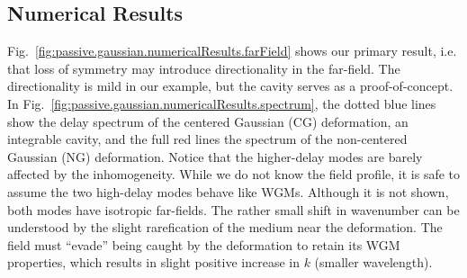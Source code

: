 \subsection{Numerical Results}
Fig.~\ref{fig:passive.gaussian.numericalResults.farField} shows our primary
result, i.e. that loss of symmetry may introduce directionality
in the far-field. The directionality is mild in our example, but the 
cavity serves as a proof-of-concept. In Fig.~\ref{fig:passive.gaussian.numericalResults.spectrum}, 
the dotted blue lines show the delay spectrum of the centered Gaussian (CG) deformation, 
an integrable cavity, and the full red lines the spectrum of the non-centered Gaussian
(NG) deformation. Notice that the higher-delay modes are barely affected by 
the inhomogeneity. While we do not know the field profile, 
it is safe to assume the two high-delay modes behave like WGMs. Although it is not shown, 
both modes have isotropic far-fields. The rather small shift in wavenumber can be
understood by the slight rarefication of the medium near the deformation. 
The field must ``evade'' being caught by the deformation to retain
its WGM properties, which results in slight positive increase in $k$ (smaller wavelength). 

